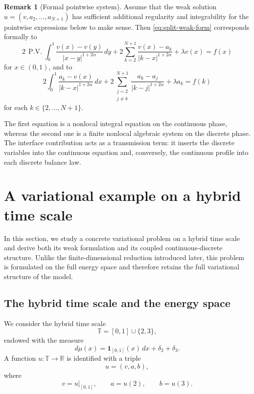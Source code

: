\documentclass[11pt]{article}
\numberwithin{equation}{section}
\theoremstyle{definition}
\newtheorem{remark}[theorem]{Remark}
\newcommand{\abs}[1]{\lvert#1\rvert}
\newcommand{\PV}{\operatorname{P.V.}}
\begin{document}
\begin{remark}[Formal pointwise system]
Assume that the weak solution $u=(v,a_2,\dots,a_{N+1})$ has sufficient additional regularity and integrability for the pointwise expressions below to make sense. Then \eqref{eq:split-weak-form} corresponds formally to
\begin{equation}\label{eq:strong-continuous}
2\,\PV\int_0^1\frac{v(x)-v(y)}{\abs{x-y}^{1+2\alpha}}\,dy
+2\sum_{k=2}^{N+1}\frac{v(x)-a_k}{\abs{k-x}^{1+2\alpha}}
+\lambda v(x)=f(x)
\end{equation}
for $x\in(0,1)$, and to
\begin{equation}\label{eq:strong-discrete}
2\int_0^1\frac{a_k-v(x)}{\abs{k-x}^{1+2\alpha}}\,dx
+2\sum_{\substack{j=2\\ j\neq k}}^{N+1}\frac{a_k-a_j}{\abs{k-j}^{1+2\alpha}}
+\lambda a_k=f(k)
\end{equation}
for each $k\in\{2,\dots,N+1\}$.

The first equation is a nonlocal integral equation on the continuous phase, whereas the second one is a finite nonlocal algebraic system on the discrete phase. The interface contribution acts as a transmission term: it inserts the discrete variables into the continuous equation and, conversely, the continuous profile into each discrete balance law.
\end{remark}


\section{A variational example on a hybrid time scale}

In this section, we study a concrete variational problem on a hybrid time scale and derive both its weak formulation and its coupled continuous-discrete structure. Unlike the finite-dimensional reduction introduced later, this problem is formulated on the full energy space and therefore retains the full variational structure of the model.

\subsection{The hybrid time scale and the energy space}

We consider the hybrid time scale
\[
\mathbb T=[0,1]\cup\{2,3\},
\]
endowed with the measure
\[
d\mu(x)=\mathbf 1_{[0,1]}(x)\,dx+\delta_2+\delta_3.
\]
A function $u:\mathbb T\to\mathbb R$ is identified with a triple
\[
u=(v,a,b),
\]
where
\[
v=u|_{[0,1]},\qquad a=u(2),\qquad b=u(3).
\]
\end{document}
